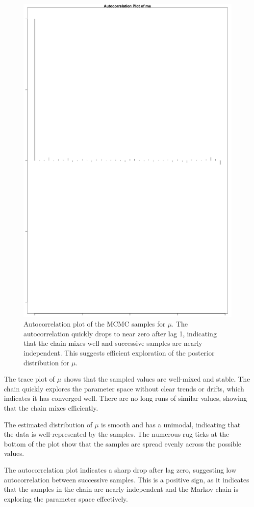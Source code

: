 \documentclass[]{article}
\begin{document}
\begin{figure}
	\centering
	\includegraphics[width=0.7\linewidth]{img/img-autocorr-mu}
    \caption{Autocorrelation plot of the MCMC samples for $\mu$. The autocorrelation quickly drops to near zero after lag 1, indicating that the chain mixes well and successive samples are nearly independent. This suggests efficient exploration of the posterior distribution for $\mu$.}
	\label{fig:img-autocorr-mu}
\end{figure}


The trace plot of $\mu$ shows that the sampled values are well-mixed and stable. The chain quickly explores the parameter space without clear trends or drifts, which indicates it has converged well. There are no long runs of similar values, showing that the chain mixes efficiently.

The estimated distribution of $\mu$ is smooth and has a unimodal, indicating that the data is well-represented by the samples. The numerous rug ticks at the bottom of the plot show that the samples are spread evenly across the possible values.

The autocorrelation plot indicates a sharp drop after lag zero, suggesting low autocorrelation between successive samples. This is a positive sign, as it indicates that the samples in the chain are nearly independent and the Markov chain is exploring the parameter space effectively.
\end{document}
